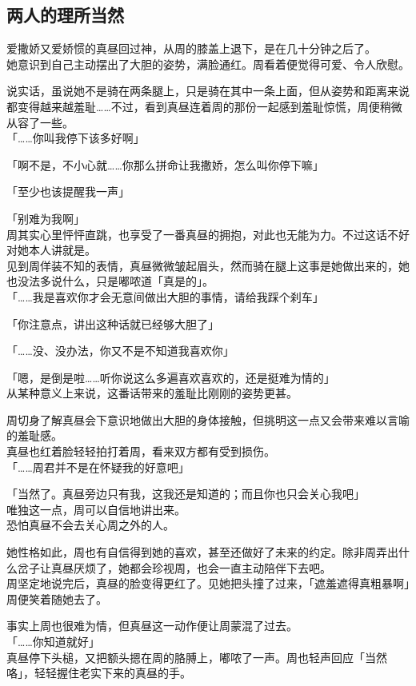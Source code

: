 \subsection{两人的理所当然}

爱撒娇又爱娇惯的真昼回过神，从周的膝盖上退下，是在几十分钟之后了。\\

她意识到自己主动摆出了大胆的姿势，满脸通红。周看着便觉得可爱、令人欣慰。

说实话，虽说她不是骑在两条腿上，只是骑在其中一条上面，但从姿势和距离来说都变得越来越羞耻……不过，看到真昼连着周的那份一起感到羞耻惊慌，周便稍微从容了一些。\\

「……你叫我停下该多好啊」

「啊不是，不小心就……你那么拼命让我撒娇，怎么叫你停下嘛」

「至少也该提醒我一声」

「别难为我啊」\\

周其实心里怦怦直跳，也享受了一番真昼的拥抱，对此也无能为力。不过这话不好对她本人讲就是。\\

见到周佯装不知的表情，真昼微微皱起眉头，然而骑在腿上这事是她做出来的，她也没法多说什么，只是嘟哝道「真是的」。\\

「……我是喜欢你才会无意间做出大胆的事情，请给我踩个刹车」

「你注意点，讲出这种话就已经够大胆了」

「……没、没办法，你又不是不知道我喜欢你」

「嗯，是倒是啦……听你说这么多遍喜欢喜欢的，还是挺难为情的」\\

从某种意义上来说，这番话带来的羞耻比刚刚的姿势更甚。

周切身了解真昼会下意识地做出大胆的身体接触，但挑明这一点又会带来难以言喻的羞耻感。\\

真昼也红着脸轻轻拍打着周，看来双方都有受到损伤。\\

「……周君并不是在怀疑我的好意吧」

「当然了。真昼旁边只有我，这我还是知道的；而且你也只会关心我吧」\\

唯独这一点，周可以自信地讲出来。\\

恐怕真昼不会去关心周之外的人。

她性格如此，周也有自信得到她的喜欢，甚至还做好了未来的约定。除非周弄出什么岔子让真昼厌烦了，她都会珍视周，也会一直主动陪伴下去吧。\\

周坚定地说完后，真昼的脸变得更红了。见她把头撞了过来，「遮羞遮得真粗暴啊」周便笑着随她去了。

事实上周也很难为情，但真昼这一动作便让周蒙混了过去。\\

「……你知道就好」\\

真昼停下头槌，又把额头摁在周的胳膊上，嘟哝了一声。周也轻声回应「当然咯」，轻轻握住老实下来的真昼的手。
